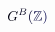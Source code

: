 \documentclass[12pt]{article}
\begin{document}
\makeatletter
\renewcommand*{\@textcolor}[3]{%
  \protect\leavevmode
  \begingroup
    \color#1{#2}#3%
  \endgroup
}
\makeatother
\begin{displaymath}
\mathcolor[RGB]{0,0,15}{G} ^ { \mathcolor[RGB]{0,0,30}{B} } \mathcolor[RGB]{0,0,45}{(} \mathbb { \mathcolor[RGB]{0,0,60}{Z} } \mathcolor[RGB]{0,0,75}{)}
\end{displaymath}
\end{document}
